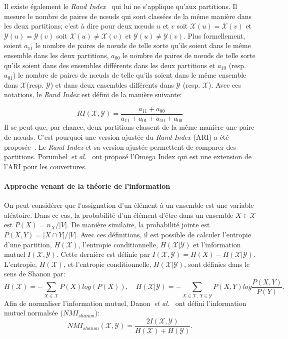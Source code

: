 Il existe également le \emph{Rand Index}~\cite{Rand1971} qui lui ne s'applique qu'aux partitions.
Il mesure le nombre de paires de n\oe uds qui sont classées de la même manière dans les deux partitions; c'est à dire pour deux n\oe uds $u$ et $v$ soit $\mathcal{X}(u)=\mathcal{X}(v)$ et $\mathcal{Y}(u)=\mathcal{Y}(v)$ soit $\mathcal{X}(u)\neq \mathcal{X}(v)$ et $\mathcal{Y}(u)\neq \mathcal{Y}(v)$.
Plus formellement, soient $a_{11}$ le nombre de paires de n\oe uds de telle sorte qu'ils soient dans le même ensemble dans les deux partitions, $a_{00}$ le nombre de paires de n\oe uds de telle sorte qu'ils soient dans des ensembles différents dans les deux partitions et $a_{10}$ (resp. $a_{01}$) le nombre de paires de n\oe uds de telle qu'ils soient dans le même ensemble dans $\mathcal{X}$(resp. $\mathcal{Y}$) et dans deux ensembles différents dans $\mathcal{Y}$ (resp. $\mathcal{X}$).
Avec ces notations, le \emph{Rand Index} est défini de la manière suivante:

\begin{equation}
RI(\mathcal{X},\mathcal{Y}) = \dfrac{a_{11} + a_{00}}{a_{11}+a_{01}+a_{10}+ a_{00}}
\end{equation}
Il se peut que, par chance, deux partitions classent de la même manière une paire de n\oe uds.
C'est pourquoi une version ajustée du \emph{Rand Index} (ARI) a été proposée~\cite{Hubert1985}.
Le \emph{Rand Index} et sa version ajustée permettent de comparer des partitions.
Porumbel~\emph{et al.}~\cite{Porumbel2011} ont proposé l'Omega Index qui est une extension de l'ARI pour les couvertures.

\paragraph{Approche venant de la théorie de l'information}
On peut considérer que l'assignation d'un élément à un ensemble est une variable aléatoire.
Dans ce cas, la probabilité d'un élément d'être dans un ensemble $X \in \mathcal{X}$ est $P(X)= n_X/|V|$.
De manière similaire, la probabilité jointe est $P(X,Y) = |X \cap Y|/|V|$.
Avec ces définitions, il est possible de calculer l'entropie d'une partition, $H(\mathcal{X})$, l'entropie conditionnelle, $H(\mathcal{X}|\mathcal{Y})$ et l'information mutuel $I(\mathcal{X},\mathcal{Y})$.
Cette dernière est définie par $I(\mathcal{X}, \mathcal{Y}) = H(X) - H(\mathcal{X}|\mathcal{Y})$.
L'entropie, $H(\mathcal{X})$, et l'entropie conditionnelle, $H(\mathcal{X}|\mathcal{Y})$, sont définies dans le sens de Shanon par: 
\begin{equation}
H(\mathcal{X}) = - \sum_{X \in \mathcal{X}} P(X)log(P(X)),\quad H(\mathcal{X}|\mathcal{Y}) = -\sum_{X \in \mathcal{X},\ Y \in \mathcal{Y}} P(X, Y) log \dfrac{P(X,Y)}{P(Y)}.
\end{equation}
Afin de normaliser l'information mutuel, Danon~\emph{et al.}~\cite{Danon2005a} ont défini l'information mutuel normalsée ($NMI_{shanon}$):
\begin{equation}
 NMI_{shanon}(\mathcal{X},\mathcal{Y}) = \dfrac{2I(\mathcal{X},\mathcal{Y})}{H(\mathcal{X})+H(\mathcal{Y})}.
\end{equation}

